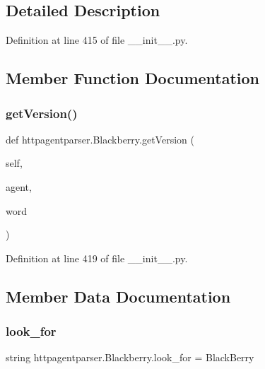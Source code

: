 \subsection{Detailed Description}


Definition at line 415 of file \+\_\+\+\_\+init\+\_\+\+\_\+.\+py.



\subsection{Member Function Documentation}
\hypertarget{classhttpagentparser_1_1_blackberry_ae2b90922396fa6882e5eb522af3db497}{}\label{classhttpagentparser_1_1_blackberry_ae2b90922396fa6882e5eb522af3db497} 
\subsubsection{\texorpdfstring{get\+Version()}{getVersion()}}
{\footnotesize\ttfamily def httpagentparser.\+Blackberry.\+get\+Version (\begin{DoxyParamCaption}\item[{}]{self,  }\item[{}]{agent,  }\item[{}]{word }\end{DoxyParamCaption})}



Definition at line 419 of file \+\_\+\+\_\+init\+\_\+\+\_\+.\+py.



\subsection{Member Data Documentation}
\hypertarget{classhttpagentparser_1_1_blackberry_a693fcf9cd7c2c554afe2da55194bfeb0}{}\label{classhttpagentparser_1_1_blackberry_a693fcf9cd7c2c554afe2da55194bfeb0} 
\subsubsection{\texorpdfstring{look\+\_\+for}{look\_for}}
{\footnotesize\ttfamily string httpagentparser.\+Blackberry.\+look\+\_\+for = \textquotesingle{}Black\+Berry\textquotesingle{}\hspace{0.3cm}{\ttfamily [static]}}



